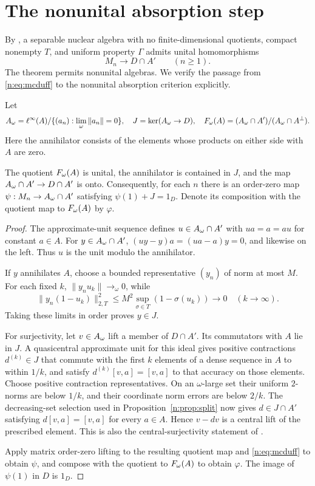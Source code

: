 \section{The nonunital absorption step}\label{n:sec:absorption}
By \cite[Theorem 4.6 and Definition 4.2]{CETW}, a separable nuclear algebra
with no finite-dimensional quotients, compact nonempty $T$, and uniform
property $\Gamma$ admits unital homomorphisms
\begin{equation}\label{n:eq:mcduff}
 M_n\longrightarrow D\cap A'\qquad(n\ge1).
\end{equation}
The theorem permits nonunital algebras. We verify the passage from
\eqref{n:eq:mcduff} to the nonunital absorption criterion explicitly.

Let
\[
 A_\omega=\ell^\infty(A)/\{(a_n):\lim_\omega\|a_n\|=0\},
 \quad J=\ker(A_\omega\to D),
 \quad F_\omega(A)=(A_\omega\cap A')/(A_\omega\cap A^\perp).
\]
Here the annihilator consists of the elements whose products on either
side with $A$ are zero.

\begin{lemma}\label{n:lem:central-lift}
The quotient $F_\omega(A)$ is unital, the annihilator is contained in $J$, and
the map $A_\omega\cap A'\to D\cap A'$ is onto. Consequently, for each $n$
there is an order-zero map $\psi:M_n\to A_\omega\cap A'$ satisfying
$\psi(1)+J=1_D$. Denote its composition with the quotient map to $F_\omega(A)$
by $\varphi$.
\end{lemma}
\begin{proof}
The approximate-unit sequence defines $u\in A_\omega\cap A'$ with
$ua=a=au$ for constant $a\in A$. For $y\in A_\omega\cap A'$,
$(uy-y)a=(ua-a)y=0$, and likewise on the left. Thus $u$ is the unit
modulo the annihilator.

If $y$ annihilates $A$, choose a bounded representative $(y_n)$ of norm
at most $M$. For each fixed $k$, $\|y_nu_k\|\to_\omega0$, while
\[
 \|y_n(1-u_k)\|_{2,T}^2
 \le M^2\sup_{\sigma\in T}(1-\sigma(u_k))\longrightarrow0
 \quad(k\to\infty).
\]
Taking these limits in order proves $y\in J$.

For surjectivity, let $v\in A_\omega$ lift a member of $D\cap A'$. Its
commutators with $A$ lie in $J$. A quasicentral approximate unit for this
ideal gives positive contractions $d^{(k)}\in J$ that commute with the
first $k$ elements of a dense sequence in $A$ to within $1/k$, and
satisfy $d^{(k)}[v,a]=[v,a]$ to that accuracy on those elements. Choose
positive contraction representatives. On an $\omega$-large set their
uniform $2$-norms are below $1/k$, and their coordinate norm errors are
below $2/k$. The decreasing-set selection used in
Proposition~\ref{n:prop:split} now gives $d\in J\cap A'$ satisfying
$d[v,a]=[v,a]$ for every $a\in A$. Hence $v-dv$ is a central lift of the
prescribed element. This is also the central-surjectivity statement of
\cite[Lemma 1.2]{CETW}.

Apply matrix order-zero lifting to the resulting quotient map and
\eqref{n:eq:mcduff} to obtain $\psi$, and compose with the quotient to
$F_\omega(A)$ to obtain $\varphi$. The image of $\psi(1)$ in $D$ is $1_D$.
\end{proof}

